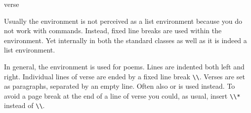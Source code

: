 \ifCommonscrextend\else
\begin{Declaration}
  \begin{Environment}{verse}\end{Environment}
\end{Declaration}%
Usually the  environment is not perceived as a list
environment because you do not work with 
commands. Instead, fixed line breaks are used within the
 environment. Yet internally in both the
standard classes as well as {\KOMAScript} it is indeed a list
environment.

In general, the  environment is used for
poems.  Lines are indented both left and
right. Individual lines of verse are ended by a fixed line break
\verb|\\|. Verses are set as paragraphs, separated by an empty
line. Often also  or
 is used instead. To avoid a page
break at the end of a line of verse you could, as usual, insert \verb|\\*|
instead of \verb|\\|.
\ifCommonmaincls
